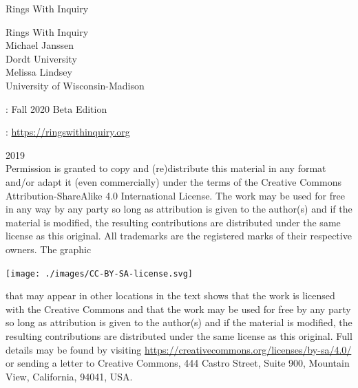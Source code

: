 \documentclass[oneside,10pt,]{book}
\newcommand{\titlepagefont}{\relax}
\numberwithin{equation}{section}
\begin{document}
%
\frontmatter
\thispagestyle{empty}
{\titlepagefont\centering
\vspace*{0.28\textheight}
{\Huge Rings With Inquiry}\\}
\clearpage
\thispagestyle{empty}
\null%
\clearpage
\thispagestyle{empty}
{\titlepagefont\centering
\vspace*{0.14\textheight}
{\Huge Rings With Inquiry}\\[3\baselineskip]
{\Large Michael Janssen}\\[0.5\baselineskip]
{\Large Dordt University}\\[3\baselineskip]
{\Large Melissa Lindsey}\\[0.5\baselineskip]
{\Large University of Wisconsin-Madison}\\}
\clearpage
\thispagestyle{empty}
\hypertarget{g:colophon:idm519234890704}{}
: Fall 2020 Beta Edition\par\medskip
{}: \href{https:\slash{}\slash{}ringswithinquiry.org}{https:\slash{}\slash{}ringswithinquiry.org}\par\medskip
\noindent\textcopyright{}2019\textendash{}\quad{}\\[0.5\baselineskip]
Permission is granted to copy and (re)distribute this material in any format and\slash{}or adapt it (even commercially) under the terms of the Creative Commons Attribution-ShareAlike 4.0 International License.  The work may be used for free in any way by any party so long as attribution is given to the author(s) and if the material is modified, the resulting contributions are distributed under the same license as this original.  All trademarks\texttrademark{} are the registered\textregistered{} marks of their respective owners. The graphic \begin{sidebyside}{1}{0.375}{0.375}{0}%
\begin{sbspanel}{0.25}%
\texttt{[image: ./images/CC-BY-SA-license.svg]}
\end{sbspanel}%
\end{sidebyside}%
 that may appear in other locations in the text shows that the work is licensed with the Creative Commons and that the work may be used for free by any party so long as attribution is given to the author(s) and if the material is modified, the resulting contributions are distributed under the same license as this original. Full details may be found by visiting \href{https://creativecommons.org/licenses/by-sa/4.0/}{https:\slash{}\slash{}creativecommons.org\slash{}licenses\slash{}by-sa\slash{}4.0\slash{}}  or sending a letter to Creative Commons, 444 Castro Street, Suite 900, Mountain View, California, 94041, USA.\par\medskip
\end{document}

